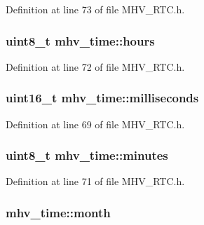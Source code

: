 \-Definition at line 73 of file \-M\-H\-V\-\_\-\-R\-T\-C.\-h.

\hypertarget{structmhv__time_a86216ab6b58bede2c74b8b38745c81f7}{
\subsubsection[{hours}]{\setlength{\rightskip}{0pt plus 5cm}uint8\-\_\-t {\bf mhv\-\_\-time\-::hours}}}
\label{structmhv__time_a86216ab6b58bede2c74b8b38745c81f7}


\-Definition at line 72 of file \-M\-H\-V\-\_\-\-R\-T\-C.\-h.

\hypertarget{structmhv__time_a88f1e6b1d010c2f21b11bd335b1fae65}{
\subsubsection[{milliseconds}]{\setlength{\rightskip}{0pt plus 5cm}uint16\-\_\-t {\bf mhv\-\_\-time\-::milliseconds}}}
\label{structmhv__time_a88f1e6b1d010c2f21b11bd335b1fae65}


\-Definition at line 69 of file \-M\-H\-V\-\_\-\-R\-T\-C.\-h.

\hypertarget{structmhv__time_a72c1e9925d2d3de254c6550c0b309347}{
\subsubsection[{minutes}]{\setlength{\rightskip}{0pt plus 5cm}uint8\-\_\-t {\bf mhv\-\_\-time\-::minutes}}}
\label{structmhv__time_a72c1e9925d2d3de254c6550c0b309347}


\-Definition at line 71 of file \-M\-H\-V\-\_\-\-R\-T\-C.\-h.

\hypertarget{structmhv__time_a832c57e459789022fb39b7c704a3e926}{
\subsubsection[{month}]{ {\bf mhv\-\_\-time\-::month}}}
\label{structmhv__time_a832c57e459789022fb39b7c704a3e926}


